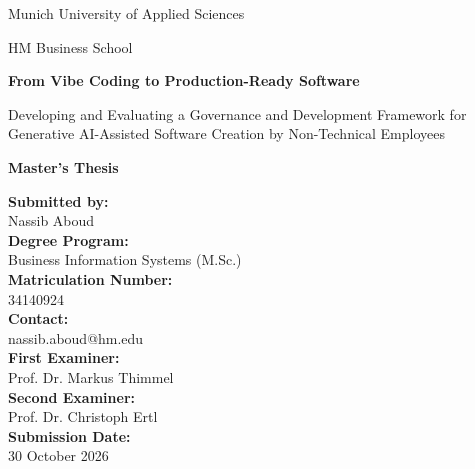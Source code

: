 \documentclass[10pt,a4paper]{article}
\begin{document}
\begin{titlepage}

    \centering

    {\fontsize{14}{16}\selectfont
    Munich University of Applied Sciences\par}

    {\fontsize{14}{16}\selectfont
    HM Business School\par}

    \vspace{3cm}

    {\fontsize{20}{24}\bfseries\selectfont
    From Vibe Coding to Production-Ready Software\par}

    \vspace{0.5cm}

    {\fontsize{15}{19}\selectfont
    Developing and Evaluating a Governance and Development Framework
    for Generative AI-Assisted Software Creation by Non-Technical Employees
    \par}

    \vspace{1.5cm}

    {\fontsize{14}{16}\bfseries\selectfont
    Master's Thesis\par}

    \vspace{2cm}

    \begin{flushleft}

        \normalsize

        \textbf{Submitted by:}\\
        Nassib Aboud\\[0.5cm]

        \textbf{Degree Program:}\\
        Business Information Systems (M.Sc.)\\[0.5cm]

        \textbf{Matriculation Number:}\\
        34140924\\[0.5cm]

        \textbf{Contact:}\\
        nassib.aboud@hm.edu\\[1cm]

        \textbf{First Examiner:}\\
        Prof. Dr. Markus Thimmel\\[0.5cm]

        \textbf{Second Examiner:}\\
        Prof. Dr. Christoph Ertl\\[0.5cm]

        \textbf{Submission Date:}\\
        30 October 2026

    \end{flushleft}

\end{titlepage}
\end{document}

